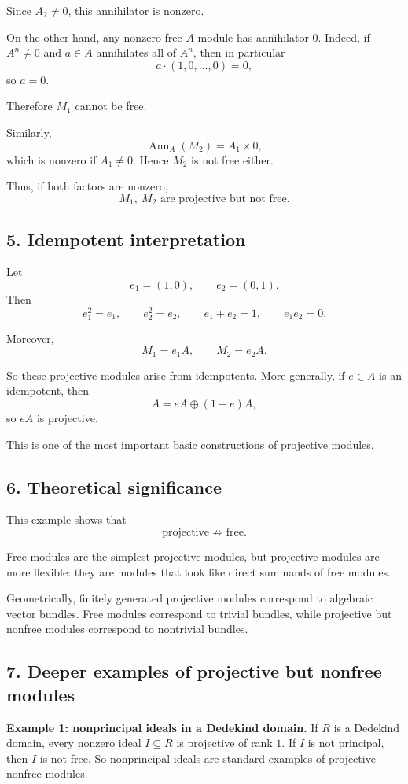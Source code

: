 \documentclass[12pt,a4paper]{article}
\theoremstyle{notespace}
\DeclareMathOperator{\Ann}{Ann}
\begin{document}
Since \(A_2\neq 0\), this annihilator is nonzero.

On the other hand, any nonzero free \(A\)-module has annihilator \(0\). Indeed, if \(A^n\neq 0\) and \(a\in A\) annihilates all of \(A^n\), then in particular
\[
a\cdot (1,0,\dots,0)=0,
\]
so \(a=0\).

Therefore \(M_1\) cannot be free.

Similarly,
\[
\Ann_A(M_2)=A_1\times 0,
\]
which is nonzero if \(A_1\neq 0\). Hence \(M_2\) is not free either.

Thus, if both factors are nonzero,
\[
M_1,\ M_2 \text{ are projective but not free.}
\]

\subsection{5. Idempotent interpretation}

Let
\[
e_1=(1,0),
\qquad
e_2=(0,1).
\]
Then
\[
e_1^2=e_1,
\qquad
e_2^2=e_2,
\qquad
e_1+e_2=1,
\qquad
e_1e_2=0.
\]

Moreover,
\[
M_1=e_1A,
\qquad
M_2=e_2A.
\]

So these projective modules arise from idempotents. More generally, if \(e\in A\) is an idempotent, then
\[
A=eA\oplus (1-e)A,
\]
so \(eA\) is projective.

This is one of the most important basic constructions of projective modules.

\subsection{6. Theoretical significance}

This example shows that
\[
\text{projective} \not\Rightarrow \text{free}.
\]

Free modules are the simplest projective modules, but projective modules are more flexible: they are modules that look like direct summands of free modules.

Geometrically, finitely generated projective modules correspond to algebraic vector bundles. Free modules correspond to trivial bundles, while projective but nonfree modules correspond to nontrivial bundles.

\subsection{7. Deeper examples of projective but nonfree modules}

\textbf{Example 1: nonprincipal ideals in a Dedekind domain.}
If \(R\) is a Dedekind domain, every nonzero ideal \(I\subseteq R\) is projective of rank \(1\). If \(I\) is not principal, then \(I\) is not free. So nonprincipal ideals are standard examples of projective nonfree modules.
\end{document}
